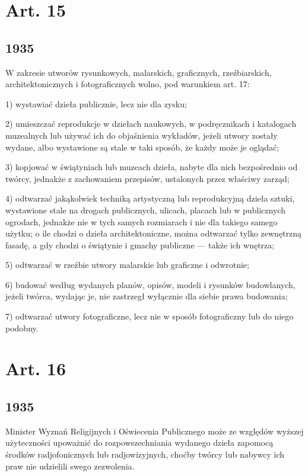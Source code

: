 \documentclass[withmarginpar]{book}
\begin{document}
\section{Art. 15}
\label{sec:art.-15}
\subsection{1935}
\label{sec:art.-15-1}

W zakresie utworów rysunkowych, malarskich, graficznych,
rzeźbiarskich, architektonicznych i fotograficznych wolno, pod
warunkiem art. 17:

1) wystawiać dzieła publicznie, lecz nie dla zysku;

2) umieszczać reprodukcje w dziełach naukowych, w podręcznikach i
katalogach muzealnych lub używać ich do objaśnienia wykładów, jeżeli
utwory zostały wydane, albo wystawione są stale w taki sposób, że
każdy może je oglądać;

3) kopjować w świątyniach lub muzeach dzieła, nabyte dla nich
bezpośrednio od twórcy, jednakże z zachowaniem przepisów, ustalonych
przez właściwy zarząd;

4) odtwarzać jakąkolwiek techniką artystyczną lub reprodukcyjną dzieła
sztuki, wystawione stale na drogach publicznych, ulicach, placach lub
w publicznych ogrodach, jednakże nie w tych samych rozmiarach i nie
dla takiego samego użytku; o ile chodzi o dzieła architektoniczne,
można odtwarzać tylko zewnętrzną fasadę, a gdy chodzi o świątynie i
gmachy publiczne — także ich wnętrza;

5) odtwarzać w rzeźbie utwory malarskie lub graficzne i odwrotnie;

6) budować według wydanych planów, opisów, modeli i rysunków
budowlanych, jeżeli twórca, wydając je, nie zastrzegł wyłącznie dla
siebie prawa budowania;

7) odtwarzać utwory fotograficzne, lecz nie w sposób fotograficzny lub
do niego podobny.

\section{Art. 16}
\label{sec:art.-16}
\subsection{1935}
\label{sec:art.-16-1}

Minister Wyznań Religijnych i Oświecenia Publicznego może ze względów
wyższej użyteczności upoważnić do rozpowszechniania wydanego dzieła
zapomocą środków radjofonicznych lub radjowizyjnych, choćby twórcy lub
nabywcy ich praw nie udzielili swego zezwolenia.
\end{document}
